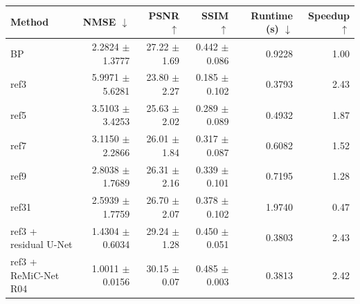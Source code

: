 \begin{tabular}{lrrrrr}
\toprule
Method & NMSE $\downarrow$ & PSNR $\uparrow$ & SSIM $\uparrow$ & Runtime (s) $\downarrow$ & Speedup $\uparrow$ \\
\midrule
BP & 2.2824 $\pm$ 1.3777 & 27.22 $\pm$ 1.69 & 0.442 $\pm$ 0.086 & 0.9228 & 1.00 \\
ref3 & 5.9971 $\pm$ 5.6281 & 23.80 $\pm$ 2.27 & 0.185 $\pm$ 0.102 & 0.3793 & 2.43 \\
ref5 & 3.5103 $\pm$ 3.4253 & 25.63 $\pm$ 2.02 & 0.289 $\pm$ 0.089 & 0.4932 & 1.87 \\
ref7 & 3.1150 $\pm$ 2.2866 & 26.01 $\pm$ 1.84 & 0.317 $\pm$ 0.087 & 0.6082 & 1.52 \\
ref9 & 2.8038 $\pm$ 1.7689 & 26.31 $\pm$ 2.16 & 0.339 $\pm$ 0.101 & 0.7195 & 1.28 \\
ref31 & 2.5939 $\pm$ 1.7759 & 26.70 $\pm$ 2.07 & 0.378 $\pm$ 0.102 & 1.9740 & 0.47 \\
ref3 + residual U-Net & 1.4304 $\pm$ 0.6034 & 29.24 $\pm$ 1.28 & 0.450 $\pm$ 0.051 & 0.3803 & 2.43 \\
ref3 + ReMiC-Net R04 & 1.0011 $\pm$ 0.0156 & 30.15 $\pm$ 0.07 & 0.485 $\pm$ 0.003 & 0.3813 & 2.42 \\
\bottomrule
\end{tabular}
